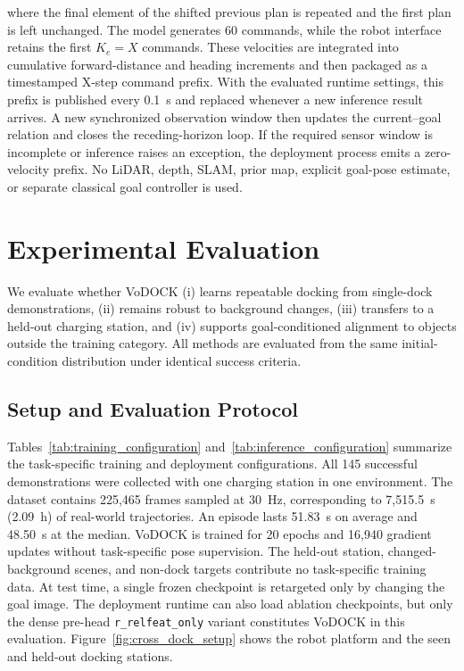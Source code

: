\documentclass[letterpaper, 10 pt, conference]{IEEEtran}  %
\begin{document}
where the final element of the shifted previous plan is repeated and the first plan is left unchanged. The model generates 60 commands, while the robot interface retains the first $K_e=X$ commands. These velocities are integrated into cumulative forward-distance and heading increments and then packaged as a timestamped X-step command prefix. With the evaluated runtime settings, this prefix is published every 0.1~s and replaced whenever a new inference result arrives. A new synchronized observation window then updates the current--goal relation and closes the receding-horizon loop. If the required sensor window is incomplete or inference raises an exception, the deployment process emits a zero-velocity prefix. No LiDAR, depth, SLAM, prior map, explicit goal-pose estimate, or separate classical goal controller is used.


\section{Experimental Evaluation}
\label{sec:experiments}

We evaluate whether VoDOCK (i) learns repeatable docking from single-dock demonstrations, (ii) remains robust to background changes, (iii) transfers to a held-out charging station, and (iv) supports goal-conditioned alignment to objects outside the training category. All methods are evaluated from the same initial-condition distribution under identical success criteria.

\subsection{Setup and Evaluation Protocol}
\label{subsec:setup}
\label{subsec:evaluation_protocol}

Tables~\ref{tab:training_configuration} and~\ref{tab:inference_configuration} summarize the task-specific training and deployment configurations. All 145 successful demonstrations were collected with one charging station in one environment. The dataset contains 225,465 frames sampled at 30~Hz, corresponding to 7,515.5~s (2.09~h) of real-world trajectories. An episode lasts 51.83~s on average and 48.50~s at the median. VoDOCK is trained for 20 epochs and 16,940 gradient updates without task-specific pose supervision. The held-out station, changed-background scenes, and non-dock targets contribute no task-specific training data. At test time, a single frozen checkpoint is retargeted only by changing the goal image. The deployment runtime can also load ablation checkpoints, but only the dense pre-head \texttt{r\_relfeat\_only} variant constitutes VoDOCK in this evaluation. Figure~\ref{fig:cross_dock_setup} shows the robot platform and the seen and held-out docking stations.
\end{document}
